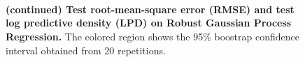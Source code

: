 \begin{figure}[H]
  \vspace{0.05in}\\
  \vspace{0.05in}\\
  \vspace{0.05in}\\
  \caption{\textbf{(continued) Test root-mean-square error (RMSE) and test log predictive density (LPD) on Robust Gaussian Process Regression.}
  The colored region shows the 95\% boostrap confidence interval obtained from 20 repetitions.}
\end{figure}

